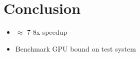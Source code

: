 \section{Conclusion}
\begin{itemize}
 \item $\approx$ 7-8x speedup
 \item Benchmark GPU bound on test system
\end{itemize}

